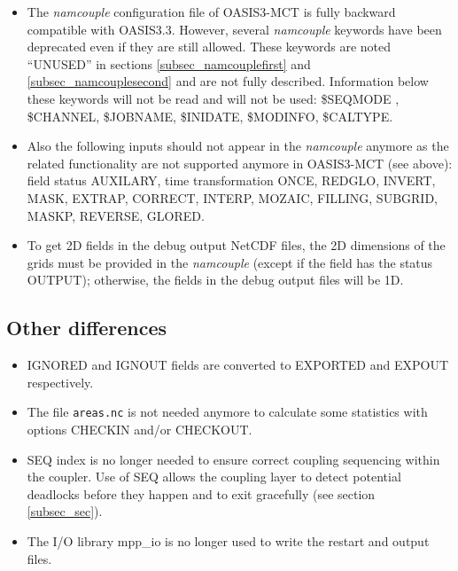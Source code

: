 \begin{itemize}

\item The {\it namcouple} configuration file of OASIS3-MCT is fully backward
compatible with OASIS3.3. However, several {\it namcouple} keywords
have been deprecated even if they are still 
allowed.  These keywords are noted ``UNUSED'' in sections
\ref{subsec_namcouplefirst} and \ref{subsec_namcouplesecond} and are
not fully described. Information below these keywords will not be read
and will not be used: \$SEQMODE , \$CHANNEL, \$JOBNAME, \$INIDATE,
\$MODINFO, \$CALTYPE.

\item Also the following inputs should not appear in the {\it namcouple}
anymore as the related functionality are not supported anymore in
OASIS3-MCT (see above): field status AUXILARY, time transformation
ONCE, REDGLO, INVERT, MASK, EXTRAP, CORRECT, INTERP, MOZAIC, FILLING,
SUBGRID, MASKP, REVERSE, GLORED. 

\item To get 2D fields in the debug output NetCDF files, the 2D dimensions of the
  grids must be provided in the {\it namcouple} (except if the field
  has the status OUTPUT); otherwise, the fields in the debug output files will be 1D.

\end{itemize}

\subsection{Other differences}
\label{sec_changes_other}

\begin{itemize}

\item IGNORED and IGNOUT fields are converted to EXPORTED and EXPOUT
  respectively.

\item The file {\tt areas.nc} is not needed anymore to calculate some
  statistics with options CHECKIN and/or CHECKOUT.

\item SEQ index is no longer needed to ensure correct coupling
  sequencing within the coupler. Use of SEQ allows the coupling layer
  to detect potential deadlocks before they happen and to exit
  gracefully (see section \ref{subsec_sec}).

\item The I/O library mpp\_io is no longer used to write the restart and output files.


\end{itemize}




